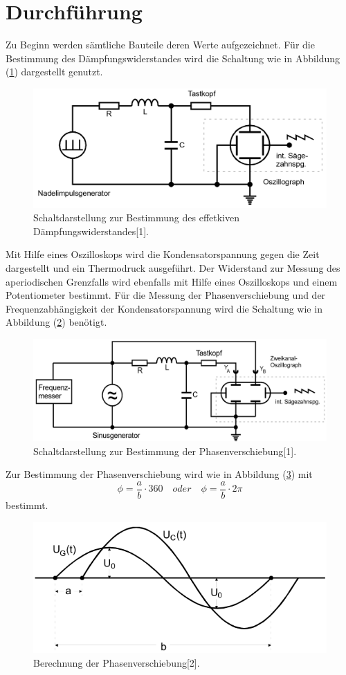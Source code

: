 \section{Durchführung}
Zu Beginn werden sämtliche Bauteile deren Werte aufgezeichnet.
Für die Bestimmung des Dämpfungswiderstandes wird die Schaltung wie in Abbildung (\ref{fig:3}) dargestellt genutzt.
\begin{figure}[H]
\centering
\includegraphics[width=\textwidth]{Schaltung1.png}
\caption{Schaltdarstellung zur Bestimmung des effetkiven Dämpfungswiderstandes[1].}
\label{fig:3}
\end{figure}
Mit Hilfe eines Oszilloskops wird die Kondensatorspannung gegen die Zeit dargestellt und ein Thermodruck ausgeführt.
Der Widerstand zur Messung des aperiodischen Grenzfalls wird ebenfalls mit Hilfe eines Oszilloskops und einem Potentiometer bestimmt.
Für die Messung der Phasenverschiebung und der Frequenzabhängigkeit der Kondensatorspannung wird die Schaltung wie in Abbildung (\ref{fig:4}) benötigt.
\begin{figure}[H]
\centering
\includegraphics[width=\textwidth]{Schaltung2.png}
\caption{Schaltdarstellung zur Bestimmung der Phasenverschiebung[1].}
\label{fig:4}
\end{figure}
Zur Bestimmung der Phasenverschiebung wird wie in Abbildung (\ref{fig:5}) mit
 \begin{equation}
   \phi = \frac{a}{b} \cdot 360 \quad oder \quad \phi = \frac{a}{b} \cdot 2\pi
\end{equation}
   bestimmt.
\begin{figure}[H]
\centering
\includegraphics[width=\textwidth]{Phase.png}
\caption{Berechnung der Phasenverschiebung[2].}
\label{fig:5}
\end{figure}
